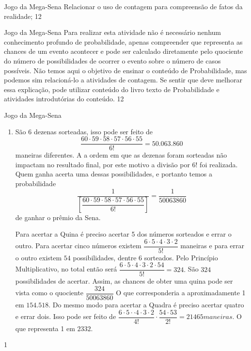 \begin{objectives}{Jogo da Mega-Sena}
{
Relacionar o uso de contagem para compreensão de fatos da realidade;
}{1}{2}
\end{objectives}
\begin{sugestions}{Jogo da Mega-Sena}
{
Para realizar esta atividade não é necessário nenhum conhecimento profundo de probabilidade, apenas compreender que representa as chances de um evento acontecer e pode ser calculado diretamente pelo quociente do número de possibilidades de ocorrer o evento sobre o número de casos possíveis.  Não temos aqui o objetivo de ensinar o conteúdo de Probabilidade, mas podemos sim relacioná-lo a atividades de contagem. Se sentir que deve melhorar essa explicação, pode utilizar conteúdo do livro texto de Probabilidade e atividades introdutórias do conteúdo.
}{1}{2}
\end{sugestions}
\begin{answer}{Jogo da Mega-Sena}
{
\begin{enumerate}
\item São 6 dezenas sorteadas, isso pode ser feito de 
\small
$$\dfrac{60 \cdot 59\cdot 58 \cdot 57 \cdot 56 \cdot 55}{6!}= 50.063.860$$
\normalsize
maneiras diferentes. A a ordem em que as dezenas foram sorteadas não impactam no resultado final, por este motivo a divisão por $6!$ foi realizada. Quem ganha acerta uma dessas possibilidades, e portanto temos a probabilidade 
\small
$$\dfrac{1}{\left[\dfrac{60 \cdot 59\cdot 58 \cdot 57 \cdot 56 \cdot 55}{6!}\right]} = \dfrac{1}{50063860}$$
\normalsize
de ganhar o prêmio da Sena.

Para acertar a Quina é preciso acertar 5 dos números sorteados e errar o outro. Para acertar cinco  números  existem $\dfrac{6\cdot 5 \cdot 4 \cdot 3 \cdot 2}{5!}$ maneiras e para errar o outro existem $54$ possibilidades, dentre 6 sorteados. Pelo Princípio Multiplicativo, no total então será $\dfrac{6 \cdot 5 \cdot 4 \cdot 3 \cdot 2 \cdot 54}{5!} = 324.$ São $324$ possibilidades de acertar. Assim, as chances de obter uma quina pode ser vista como o quociente $\dfrac{324}{50063860}$ O que corresponderia a aproximadamente 1 em $154.518$. Do mesmo modo para acertar a Quadra é preciso acertar quatro e errar dois. Isso pode ser feito de $\dfrac{6 \cdot 5 \cdot \cdot 4 \cdot 3 \cdot 2}{4!}\cdot \dfrac{54\cdot53}{2!}=21465 maneiras.$ O que representa 1 em $2332.$
\end{enumerate}
}{1}
\end{answer}
